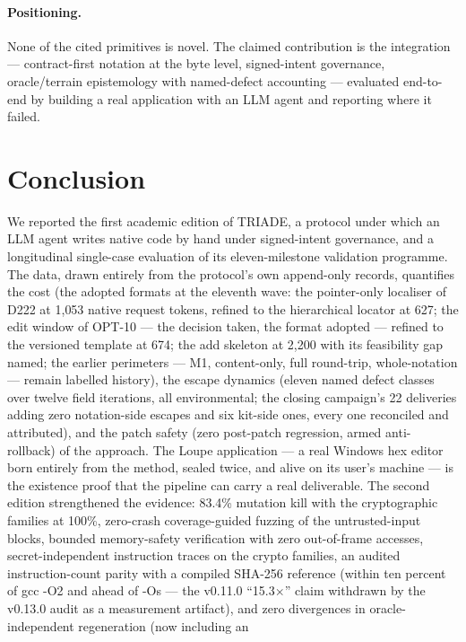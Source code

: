 \documentclass[10pt,a4paper]{article}
\begin{document}
\paragraph{Positioning.} None of the cited primitives is novel. The
claimed contribution is the integration --- contract-first notation at
the byte level, signed-intent governance, oracle/terrain epistemology
with named-defect accounting --- evaluated end-to-end by building a real
application with an LLM agent and reporting where it failed.

\section{Conclusion}\label{sec:conclusion}

We reported the first academic edition of TRIADE, a protocol under which
an LLM agent writes native code by hand under signed-intent governance,
and a longitudinal single-case evaluation of its eleven-milestone
validation programme. The data, drawn entirely from the protocol's own
append-only records, quantifies the cost (the adopted formats at the
eleventh wave: the pointer-only localiser of D222 at 1{,}053 native
request tokens, refined to the hierarchical locator at 627; the edit
window of OPT-10 --- the decision taken, the format adopted ---
refined to the versioned template at 674; the add skeleton at
2{,}200 with its feasibility gap named; the earlier perimeters --- M1,
content-only, full round-trip, whole-notation --- remain labelled
history), the
escape dynamics (eleven named defect classes over twelve field
iterations, all environmental; the closing campaign's 22 deliveries
adding zero notation-side escapes and six kit-side ones, every one
reconciled and attributed), and the patch safety (zero
post-patch regression, armed anti-rollback) of the approach. The Loupe
application --- a real Windows hex editor born entirely from the method,
sealed twice, and alive on its user's machine --- is the existence proof
that the pipeline can carry a real deliverable. The second edition strengthened the
evidence: 83.4\% mutation kill with the cryptographic families at
100\%, zero-crash coverage-guided fuzzing of the untrusted-input blocks,
bounded memory-safety verification with zero out-of-frame accesses,
secret-independent instruction traces on the crypto families, an audited
instruction-count parity with a compiled SHA-256 reference (within ten
percent of gcc -O2 and ahead of -Os --- the v0.11.0 ``15.3$\times$''
claim withdrawn by the v0.13.0 audit as a measurement artifact), and zero divergences in oracle-independent regeneration (now including an
\end{document}

